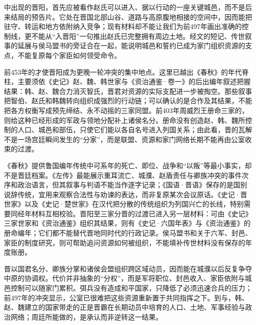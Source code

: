 中出现的晋阳，首先应被看作赵氏可以进入、据以行动的一座关键城邑，而不是后来结局的预告片。它处在晋国北部山谷、道路与高原腹地相接的空间中，因而能把驻守、转运和地方依附纳入竞争；现有材料却不能让我们为前497年画出准确的控制线，更不能从“入晋阳”一句推出赵氏已完整拥有周边土地。经文的短记、传世叙事的延展与侯马盟书的旁证合在一起，能说明城邑和誓约已成为家门组织资源的支点，不能复原每个家臣如何领受命令。

前453年的才使晋阳成为更晚一轮冲突的集中地点。这里已越出《春秋》的年代脊柱，主要须依《史记》赵、魏、韩世家与《资治通鉴·卷一》的后出编年叙述把握结果：韩、赵、魏合力消灭智氏，晋君对资源的实际支配进一步被掏空。那些叙事把智伯、赵氏和韩魏转向组织成强烈的行动链；可以确认的是合作及其结果，不能把各方权衡写成预先缔结、永不动摇的三家同盟。前403年周威烈王册命三家的，则给这种已经形成的军政与领地分配补上诸侯名分。册命没有创造赵、韩、魏所控制的人口、城邑和部伍，只使它们能以各自名号进入列国关系；由此看，晋的瓦解不是一场宫廷瞬间发生的“分家”，而是联盟、资源和家门网络长期不能再由公室收束的过渡。

\begin{sourcenote}
《春秋》提供鲁国编年传统中可系年的死亡、即位、战争和“以叛”等最小事实，却不是晋廷档案。《左传》最能展示重耳流亡、城濮、赵盾责任与卿族冲突的事件次序和政治语言，但其叙事与判语不能当作逐字记录；《国语·晋语》保存的是国别说辞传统，宜用来观察合法性与劝谏的表达，而非复原某次会议原话。《史记·晋世家》以及《史记·楚世家》在汉代把分散的传统组织为列国兴亡的长线，特别需要同经年材料互相校验。晋阳至三家分晋的过渡已进入另一层材料：可由《史记》三家世家和《资治通鉴》组织其结果，则有《史记·六国年表》与《资治通鉴》的册命编年；它们都不能替代晋地同时代的行政记录。侯马盟书和关于六军、封邑、家臣的制度研究，则可帮助追问资源如何被组织，不能填补传世材料没有保存的年度账册。
\end{sourcenote}



\begin{turningpoint}
晋以国君名分、卿族分掌和诸侯会盟组织跨区域动员，因而能在城濮以后反复争夺中原的协调权。代价并非抽象的“分权”，而是军将职位、封邑收入、家臣依附与城邑控制可以随家门累积。弭兵没有造成和平国家，只降低了必须迅速合兵的压力；前497年的冲突显示，公室已很难把这些资源重新置于共同指挥之下。到与，韩、赵、魏建立的国家带走的正是晋霸在长期动员中培育的人口、土地、军事经验与政治网络；周廷所能做的，是承认而非逆转这一结果。
\end{turningpoint}
